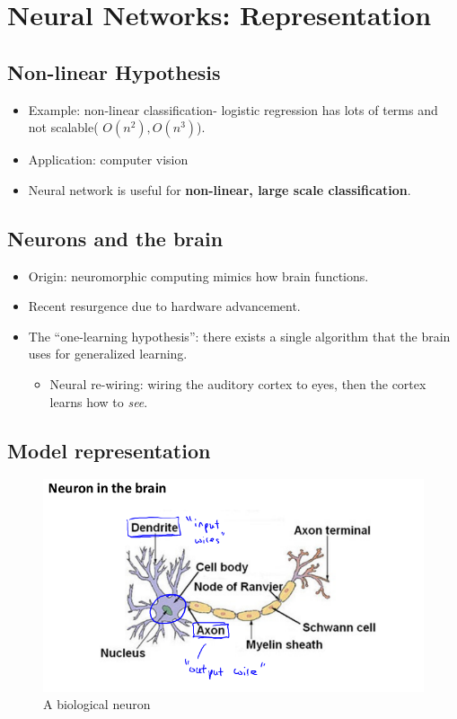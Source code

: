 \section{Neural Networks: Representation}

    \subsection{Non-linear Hypothesis}
        \begin{itemize}
            \item Example: non-linear classification- logistic regression has lots of terms and not scalable( $O(n^2), O(n^3)$).
            \item Application: computer vision
            \item Neural network is useful for \textbf{non-linear, large scale classification}.
        \end{itemize}

    \subsection{Neurons and the brain}
        \begin{itemize}
            \item Origin: neuromorphic computing mimics how brain functions.
            \item Recent resurgence due to hardware advancement.
            \item The ``one-learning hypothesis'': there exists a single algorithm that the brain uses for generalized learning. 
                \begin{itemize}
                    \item Neural re-wiring: wiring the auditory cortex to eyes, then the cortex learns how to \emph{see}.
                \end{itemize}
        \end{itemize} 


    \subsection{Model representation}
        \begin{figure}[htbp]
            \centering
            \includegraphics[width=\textwidth]{image/neuron.png}
            \caption{A biological neuron}
            \label{fig:neuron}
        \end{figure}

